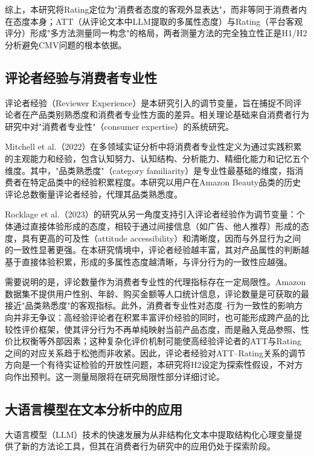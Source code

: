 综上，本研究将Rating定位为"消费者态度的客观外显表达"，而非等同于消费者内在态度本身；ATT（从评论文本中LLM提取的多属性态度）与Rating（平台客观评分）形成"多方法测量同一构念"的格局，两者测量方法的完全独立性正是H1/H2分析避免CMV问题的根本依据。

\subsection{评论者经验与消费者专业性}

评论者经验（Reviewer Experience）是本研究引入的调节变量，旨在捕捉不同评论者在产品类别熟悉度和消费者专业性方面的差异。相关理论基础来自消费者行为研究中对"消费者专业性"（consumer expertise）的系统研究。

Mitchell et al.（2022）\cite{mitchell2022}在多领域实证分析中将消费者专业性定义为通过实践积累的主观能力和经验，包含认知努力、认知结构、分析能力、精细化能力和记忆五个维度。其中，"品类熟悉度"（category familiarity）是专业性最基础的维度，指消费者在特定品类中的经验积累程度。本研究以用户在Amazon Beauty品类的历史评论总数衡量评论者经验，代理其品类熟悉度。

Rocklage et al.（2023）\cite{rocklage2023}的研究从另一角度支持引入评论者经验作为调节变量：个体通过直接体验形成的态度，相较于通过间接信息（如广告、他人推荐）形成的态度，具有更高的可及性（attitude accessibility）和清晰度，因而与外显行为之间的一致性显著更强。在本研究情境中，评论者经验越丰富，其对产品属性的判断越基于直接体验积累，形成的多属性态度越清晰，与评分行为的一致性应越强。

需要说明的是，评论数量作为消费者专业性的代理指标存在一定局限性。Amazon数据集不提供用户性别、年龄、购买金额等人口统计信息，评论数量是可获取的最接近"品类熟悉度"的客观指标。此外，消费者专业性对态度--行为一致性的影响方向并非无争议：高经验评论者在积累丰富评价经验的同时，也可能形成跨产品的比较性评价框架，使其评分行为不再单纯映射当前产品态度，而是融入竞品参照、性价比权衡等外部因素；这种复杂化评价机制可能使高经验评论者的ATT与Rating之间的对应关系趋于松弛而非收紧。因此，评论者经验对ATT--Rating关系的调节方向是一个有待实证检验的开放性问题，本研究将H2设定为探索性假设，不对方向作出预判。这一测量局限将在研究局限性部分详细讨论。

\subsection{大语言模型在文本分析中的应用}

大语言模型（LLM）技术的快速发展为从非结构化文本中提取结构化心理变量提供了新的方法论工具，但其在消费者行为研究中的应用仍处于探索阶段。

